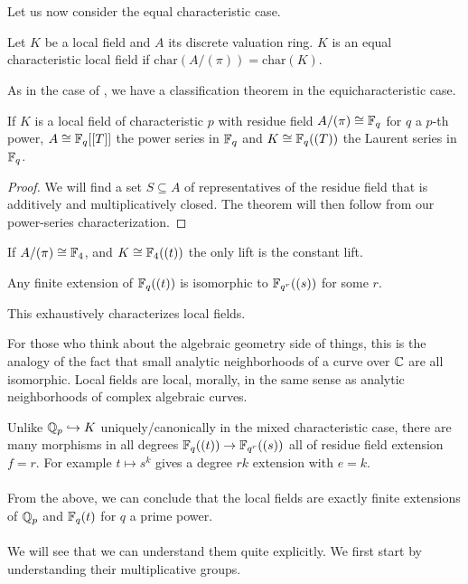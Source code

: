 \\\\
Let us now consider the equal characteristic case. 
\begin{definition}\label{def: equal characteristic local field}
  Let $K$ be a local field and $A$ its discrete valuation ring. $K$ is an equal characteristic local field if $\mathrm{char}(A/(\pi))=\mathrm{char}(K)$. 
\end{definition}
As in the case of , we have a classification theorem in the equicharacteristic case. 
\begin{theorem}
  If $K$ is a local field of characteristic $p$ with residue field $A/(\pi)\cong\mathbb{F}_{q}$ for $q$ a $p$-th power, $A\cong\mathbb{F}_{q}[[T]]$ the power series in $\mathbb{F}_{q}$ and $K\cong\mathbb{F}_{q}((T))$ the Laurent series in $\mathbb{F}_{q}$. 
\end{theorem}
\begin{proof}
  We will find a set $S\subseteq A$ of representatives of the residue field that is additively and multiplicatively closed. The theorem will then follow from our power-series characterization.  
\end{proof}
\begin{example}
	If $A/(\pi)\cong\mathbb{F}_{4}$, and $K\cong\mathbb{F}_{4}((t))$ the only lift is the constant lift. 
\end{example}
\begin{corollary}
	Any finite extension of $\mathbb{F}_{q}((t))$ is isomorphic to $\mathbb{F}_{q^{r}}((s))$ for some $r$. 
\end{corollary}
This exhaustively characterizes local fields. 
\begin{remark}
	For those who think about the algebraic geometry side of things, this is the analogy of the fact that small analytic neighborhoods of a curve over $\mathbb{C}$ are all isomorphic. Local fields are local, morally, in the same sense as analytic neighborhoods of complex algebraic curves. 
\end{remark}
Unlike $\mathbb{Q}_{p}\hookrightarrow K$ uniquely/canonically in the mixed characteristic case, there are many morphisms in all degrees $\mathbb{F}_{q}((t))\to\mathbb{F}_{q^{r}}((s))$ all of residue field extension $f=r$. For example $t\mapsto s^{k}$ gives a degree $rk$ extension with $e=k$. 
\\\\
From the above, we can conclude that the local fields are exactly finite extensions of $\mathbb{Q}_{p}$ and $\mathbb{F}_{q}(t)$ for $q$ a prime power. 
\\\\
We will see that we can understand them quite explicitly. We first start by understanding their multiplicative groups. 